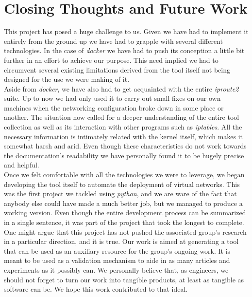 \chapter{Closing Thoughts and Future Work}
    This project has posed a huge challenge to us. Given we have had to implement it entirely from the ground up we have had to grapple with several different technologies. In the case of \textit{docker} we have had to push its conception a little bit further in an effort to achieve our purpose. This need implied we had to circumvent several existing limitations derived from the tool itself not being designed for the use we were making of it.\\

    Aside from \textit{docker}, we have also had to get acquainted with the entire \textit{iproute2} suite. Up to now we had only used it to carry out small fixes on our own machines when the networking configuration broke down in some place or another. The situation now called for a deeper understanding of the entire tool collection as well as its interaction with other programs such as \textit{iptables}. All the necessary information is intimately related with the kernel itself, which makes it somewhat harsh and arid. Even though these characteristics do not work towards the documentation's readability we have personally found it to be hugely precise and helpful.\\

    Once we felt comfortable with all the technologies we were to leverage, we began developing the tool itself to automate the deployment of virtual networks. This was the first project we tackled using \textit{python}, and we are ware of the fact that anybody else could have made a much better job, but we managed to produce a working version. Even though the entire development process can be summarized in a single sentence, it was part of the project that took the longest to complete.\\

    One might argue that this project has not pushed the associated group's research in a particular direction, and it is true. Our work is aimed at generating a tool that can be used as an auxiliary resource for the group's ongoing work. It is meant to be used as a validation mechanism to aide in as many articles and experiments as it possibly can. We personally believe that, as engineers, we should not forget to turn our work into tangible products, at least as tangible as software can be. We hope this work contributed to that ideal.\\

